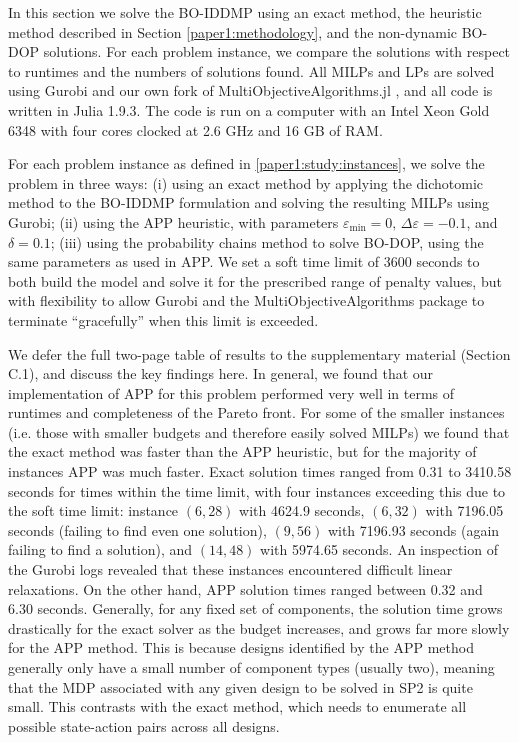 \documentclass[11pt,authoryear,a4paper]{article}
\theoremstyle{definition}
\begin{document}
{In this section we solve the BO-IDDMP using an exact method, the heuristic method described in Section \ref{paper1:methodology}, and the non-dynamic BO-DOP solutions. For each problem instance, we compare the solutions with respect to runtimes and the numbers of solutions found. All MILPs and LPs are solved using Gurobi \citep{gurobi} and our own fork of MultiObjectiveAlgorithms.jl \citep{dowson2025multiObjectiveAlgorithmsJl}, and all code is written in Julia 1.9.3. The code is run on a computer with an Intel Xeon Gold 6348 with four cores clocked at 2.6 GHz and 16 GB of RAM. 

For each problem instance as defined in \autoref{paper1:study:instances}, we solve the problem in three ways: (i) using an exact method by applying the dichotomic method to the BO-IDDMP formulation and solving the resulting MILPs using Gurobi; (ii) using the APP heuristic, with parameters $\varepsilon_{\min} = 0,\, \Delta\varepsilon = -0.1$, and $\delta = 0.1$; (iii) using the probability chains method to solve BO-DOP, using the same parameters as used in APP. We set a soft time limit of 3600 seconds to both build the model and solve it for the prescribed range of penalty values, but with flexibility to allow Gurobi and the MultiObjectiveAlgorithms package to terminate ``gracefully'' when this limit is exceeded. 

We defer the full two-page table of results to the supplementary material (Section C.1), and discuss the key findings here. In general, we found that our implementation of APP for this problem performed very well in terms of runtimes and completeness of the Pareto front. For some of the smaller instances (i.e. those with smaller budgets and therefore easily solved MILPs) we found that the exact method was faster than the APP heuristic, but for the majority of instances APP was much faster. Exact solution times ranged from 0.31 to 3410.58 seconds for times within the time limit, with four instances exceeding this due to the soft time limit: instance $(6,28)$ with 4624.9 seconds, $(6,32)$ with 7196.05 seconds (failing to find even one solution), $(9,56)$ with 7196.93 seconds (again failing to find a solution), and $(14,48)$ with 5974.65 seconds. An inspection of the Gurobi logs revealed that these instances encountered difficult linear relaxations. On the other hand, APP solution times ranged between 0.32 and 6.30 seconds. Generally, for any fixed set of components, the solution time grows drastically for the exact solver as the budget increases, and grows far more slowly for the APP method. This is because designs identified by the APP method generally only have a small number of component types (usually two), meaning that the MDP associated with any given design to be solved in SP2 is quite small. This contrasts with the exact method, which needs to enumerate all possible state-action pairs across all designs.  

}
\end{document}
